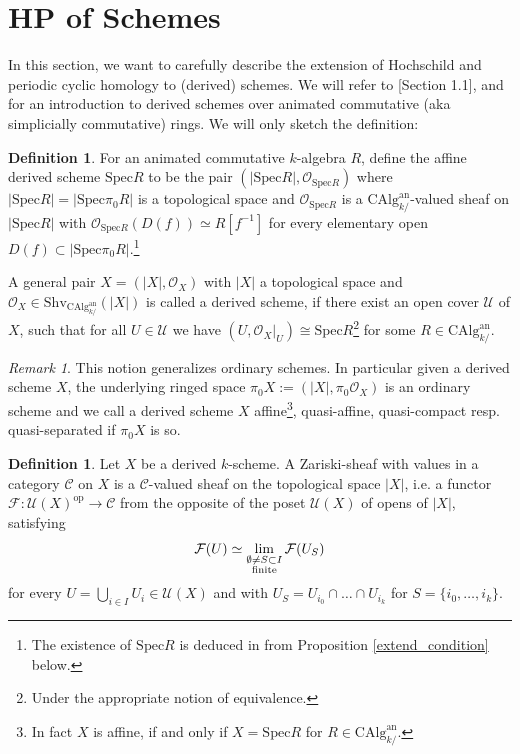 \documentclass[10pt, reqno]{amsart}
\theoremstyle{definition}
\newtheorem{definition}[theorem]{Definition}
\theoremstyle{remark}
\newtheorem{remark}[theorem]{Remark}
\newcommand{\CAlg}{\mathrm{CAlg}}
\newcommand{\op}{\mathrm{op}}
\newcommand{\C}{\mathcal{C}}
\newcommand{\Spec}{\mathrm{Spec}}
\renewcommand{\O}{\mathcal O}
\newcommand{\an}{\mathrm{an}}
\newcommand{\F}{\mathcal{F}}
\newcommand{\Shv}{\mathrm{Shv}}
\newcommand{\U}{\mathcal{U}}
\begin{document}
\section{HP of Schemes}\label{scheme}

In this section, we want to carefully describe the extension of Hochschild and periodic cyclic homology to (derived) schemes. 
We will refer to \cite{Lur18} [Section 1.1], \cite{Lur11} and \cite{To14} for an introduction to derived schemes over animated commutative (aka simplicially commutative) rings. We will only sketch the definition:

\begin{definition}
	For an animated commutative $k$-algebra $R$, define the affine derived scheme $\Spec R$ to be the pair $(|\Spec R|,\O_{\Spec R})$ where $|\Spec R|=|\Spec\pi_0R|$ is a topological space and $\O_{\Spec R}$ is a $\CAlg^\an_{k/}$-valued sheaf on $|\Spec R|$ with $\O_{\Spec R}(D(f))\simeq R[f^{-1}]$ for every elementary open $D(f)\subset |\Spec \pi_0R|$.\footnote{The existence of $\Spec R$ is deduced in \cite{Lur18} from Proposition \ref{extend_condition} below.}
	
	A general pair $X=(|X|,\O_X)$ with $|X|$ a topological space and $\O_X\in\Shv_{\CAlg^\an_{k/}}(|X|)$ is called a derived scheme, if there exist an open cover $\U$ of $X$, such that for all $U\in\U$ we have $(U,\O_X|_U)\cong \Spec R$\footnote{Under the appropriate notion of equivalence.} for some $R\in\CAlg^\an_{k/}$.
\end{definition}

\begin{remark}
	This notion generalizes ordinary schemes. In particular given a derived scheme $X$, the underlying ringed space $\pi_0X:=(|X|,\pi_0\O_X)$ is an ordinary scheme and we call a derived scheme $X$ affine\footnote{In fact $X$ is affine, if and only if $X=\Spec R$ for $R\in\CAlg^\an_{k/}$.}, quasi-affine, quasi-compact resp. quasi-separated if $\pi_0X$ is so.
\end{remark}

\begin{definition}\label{sheaf}
	Let $X$ be a derived $k$-scheme. A Zariski-sheaf with values in a category $\C$ on $X$ is a $\C$-valued sheaf on the topological space $|X|$, i.e. a functor $\F\colon\U(X)^\op\to \C$ from the opposite of the poset $\U(X)$ of opens of $|X|$, satisfying
	\[\F(U)\simeq\lim_{\begin{subarray} c\emptyset\neq S\subset I\\\text{finite}\end{subarray}}\F(U_S)\]
	for every $U=\bigcup_{i\in I}U_i\in\U(X)$ and with $U_S=U_{i_0}\cap\ldots\cap U_{i_k}$ for $S=\{i_0,\ldots,i_k\}$.
\end{definition}
\end{document}
